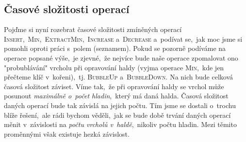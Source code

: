 

\subsection{Časové složitosti operací}

Pojďme si nyní rozebrat časové složitosti zmíněných operací \textsc{Insert},~\textsc{Min},~\textsc{ExtractMin},~\textsc{Increase} a~\textsc{Decrease} a~podívat se,~jak moc jsme si pomohli oproti práci s~polem (seznamem). Pokud se pozorně podíváme na operace popsané výše,~je zjevné,~že nejvíce bude naše operace zpomalovat ono "probublávání" vrcholu při opravování haldy (vyjma operace \textsc{Min},~kde jen přečteme klíč v~kořeni),~tj. \textsc{BubbleUp} a~\textsc{BubbleDown}. Na nich bude celková časová složitost záviset.
Víme tak,~že při opravování haldy se vrchol může posunout \emph{maximálně o~počet hladin},~který má daná halda. Časová složitost daných operací bude tak závislá na jejich počtu. Tím jsme se dostali o~trochu blíže řešení,~ale rádi bychom věděli,~jak se bude době trvání daných operací měnit v~závislosti na \emph{počtu vrcholů v~haldě},~nikoliv počtu hladin. Mezi těmito proměnnými však existuje hezká závislost.

